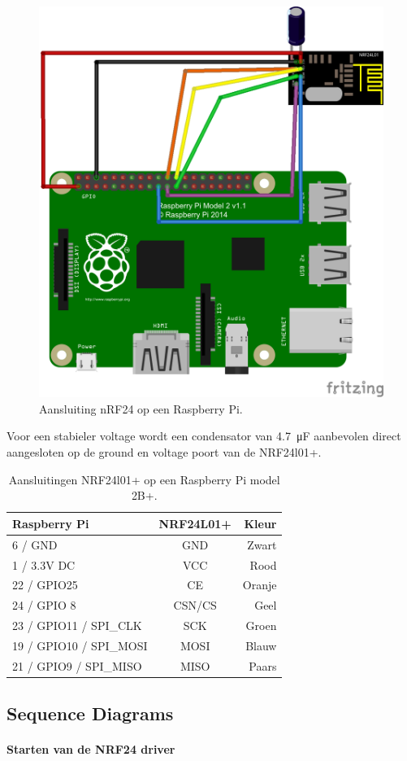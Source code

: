 \documentclass[a4paper, 11pt, oneside]{report}
\begin{document}
\begin{figure}[H]
	\begin{center}\includegraphics[width=.4\linewidth]{Afbeeldingen/fritzing_raspberry_nrf.png}\end{center}
	\caption{Aansluiting nRF24 op een Raspberry Pi.}
	\label{fig:component:aansluting}
\end{figure}

Voor een stabieler voltage wordt een condensator van \SI{4.7}{\micro\farad} aanbevolen direct aangesloten op de ground en voltage poort van de NRF24l01+.

\begin{table}[H]
	\centering
		\begin{tabular}{|l|c|r|}
			\hline
			\rowcolor[HTML]{C0C0C0} 
			Raspberry Pi & NRF24L01+ & Kleur \\ \hline
			6 / GND & GND & Zwart \\ \hline
			1 / 3.3V DC & VCC & Rood \\ \hline
			22 / GPIO25 & CE & Oranje \\ \hline
			24 / GPIO 8 & CSN/CS & Geel \\ \hline
			23 / GPIO11 / SPI\_CLK & SCK & Groen \\ \hline
			19 / GPIO10 / SPI\_MOSI & MOSI & Blauw \\ \hline
			21 / GPIO9 / SPI\_MISO & MISO & Paars \\ \hline
		\end{tabular}%
	\caption{Aansluitingen NRF24l01+ op een Raspberry Pi model 2B+.}
	\label{tab:raspberry-nrf-aanslutingen}
\end{table}

\subsection{Sequence Diagrams}
\label{DetailedDesign:NRF24:sequence}

\paragraph{Starten van de NRF24 driver}
\label{DetailedDesign:NRF24:sequence:SetupNRF24}
\end{document}
